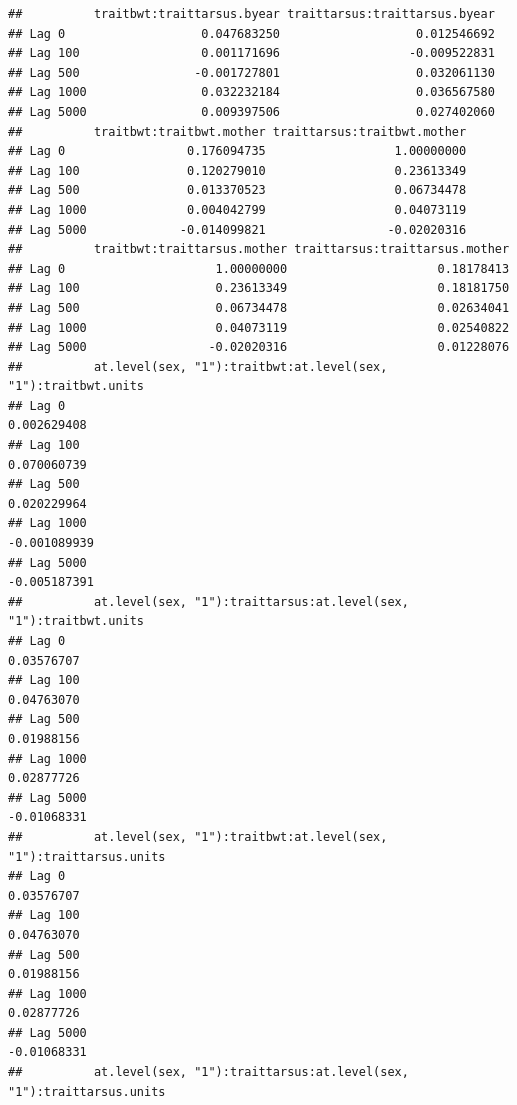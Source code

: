 \documentclass[
  12pt,
]{book}
\begin{document}
\begin{verbatim}
##          traitbwt:traittarsus.byear traittarsus:traittarsus.byear
## Lag 0                   0.047683250                   0.012546692
## Lag 100                 0.001171696                  -0.009522831
## Lag 500                -0.001727801                   0.032061130
## Lag 1000                0.032232184                   0.036567580
## Lag 5000                0.009397506                   0.027402060
##          traitbwt:traitbwt.mother traittarsus:traitbwt.mother
## Lag 0                 0.176094735                  1.00000000
## Lag 100               0.120279010                  0.23613349
## Lag 500               0.013370523                  0.06734478
## Lag 1000              0.004042799                  0.04073119
## Lag 5000             -0.014099821                 -0.02020316
##          traitbwt:traittarsus.mother traittarsus:traittarsus.mother
## Lag 0                     1.00000000                     0.18178413
## Lag 100                   0.23613349                     0.18181750
## Lag 500                   0.06734478                     0.02634041
## Lag 1000                  0.04073119                     0.02540822
## Lag 5000                 -0.02020316                     0.01228076
##          at.level(sex, "1"):traitbwt:at.level(sex, "1"):traitbwt.units
## Lag 0                                                      0.002629408
## Lag 100                                                    0.070060739
## Lag 500                                                    0.020229964
## Lag 1000                                                  -0.001089939
## Lag 5000                                                  -0.005187391
##          at.level(sex, "1"):traittarsus:at.level(sex, "1"):traitbwt.units
## Lag 0                                                          0.03576707
## Lag 100                                                        0.04763070
## Lag 500                                                        0.01988156
## Lag 1000                                                       0.02877726
## Lag 5000                                                      -0.01068331
##          at.level(sex, "1"):traitbwt:at.level(sex, "1"):traittarsus.units
## Lag 0                                                          0.03576707
## Lag 100                                                        0.04763070
## Lag 500                                                        0.01988156
## Lag 1000                                                       0.02877726
## Lag 5000                                                      -0.01068331
##          at.level(sex, "1"):traittarsus:at.level(sex, "1"):traittarsus.units

\end{verbatim}
\end{document}
